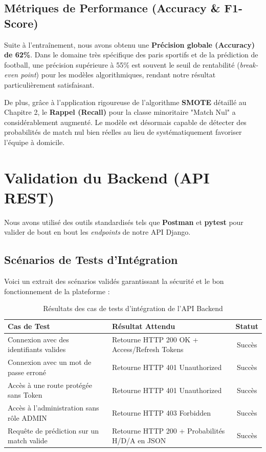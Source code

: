 \subsection{Métriques de Performance (Accuracy \& F1-Score)}
Suite à l'entraînement, nous avons obtenu une \textbf{Précision globale (Accuracy) de 62\%}. Dans le domaine très spécifique des paris sportifs et de la prédiction de football, une précision supérieure à 55\% est souvent le seuil de rentabilité (\textit{break-even point}) pour les modèles algorithmiques, rendant notre résultat particulièrement satisfaisant.

De plus, grâce à l'application rigoureuse de l'algorithme \textbf{SMOTE} détaillé au Chapitre 2, le \textbf{Rappel (Recall)} pour la classe minoritaire "Match Nul" a considérablement augmenté. Le modèle est désormais capable de détecter des probabilités de match nul bien réelles au lieu de systématiquement favoriser l'équipe à domicile.

\section{Validation du Backend (API REST)}

Nous avons utilisé des outils standardisés tels que \textbf{Postman} et \textbf{pytest} pour valider de bout en bout les \textit{endpoints} de notre API Django.

\subsection{Scénarios de Tests d'Intégration}
Voici un extrait des scénarios validés garantissant la sécurité et le bon fonctionnement de la plateforme :

\begin{table}[H]
    \centering
    \renewcommand{\arraystretch}{1.5}
    \begin{tabularx}{\textwidth}{|L|Y|c|}
        \hline
        \textbf{Cas de Test} & \textbf{Résultat Attendu} & \textbf{Statut} \\
        \hline
        Connexion avec des identifiants valides & Retourne HTTP 200 OK + Access/Refresh Tokens & \textcolor{EMSIGreen}{Succès} \\
        \hline
        Connexion avec un mot de passe erroné & Retourne HTTP 401 Unauthorized & \textcolor{EMSIGreen}{Succès} \\
        \hline
        Accès à une route protégée sans Token & Retourne HTTP 401 Unauthorized & \textcolor{EMSIGreen}{Succès} \\
        \hline
        Accès à l'administration sans rôle ADMIN & Retourne HTTP 403 Forbidden & \textcolor{EMSIGreen}{Succès} \\
        \hline
        Requête de prédiction sur un match valide & Retourne HTTP 200 + Probabilités H/D/A en JSON & \textcolor{EMSIGreen}{Succès} \\
        \hline
    \end{tabularx}
    \caption{Résultats des cas de tests d'intégration de l'API Backend}
\end{table}

